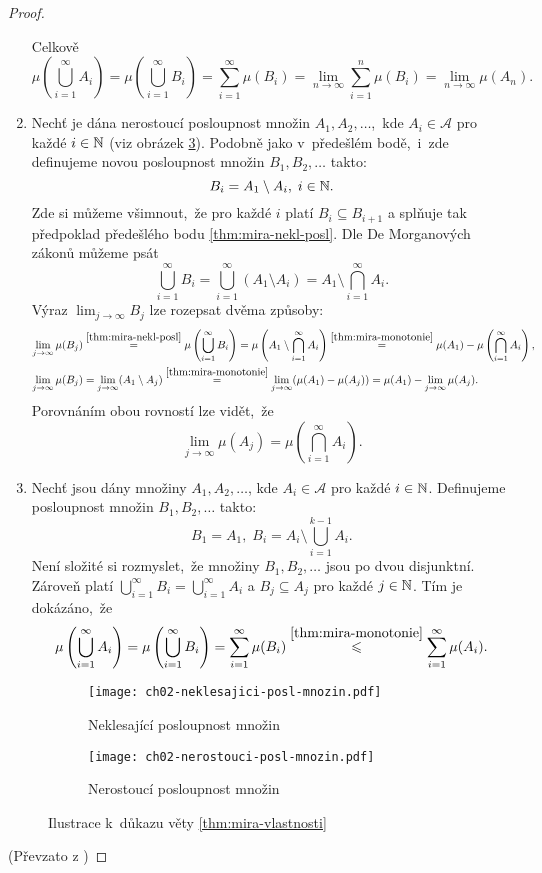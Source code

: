 \begin{proof}
\begin{enumerate}[label=\textit{(\roman*)}]
        Celkově
        \[\mu\left(\bigcup_{i=1}^\infty A_i\right)=\mu\left(\bigcup_{i=1}^\infty B_i\right)=\sum_{i=1}^{\infty}\mu(B_i)=\lim_{n\to\infty}\sum_{i=1}^{n}\mu(B_i)=\lim_{n\to\infty}\mu(A_n).\]
        \item Nechť je dána nerostoucí posloupnost množin $A_1,A_2,\ldots$,~kde $A_i\in\mathcal{A}$ pro každé $i\in\mathbb{N}$ (viz obrázek \ref{fig:nerost-posl-mnozin}). Podobně jako v~předešlém bodě,~i~zde definujeme novou posloupnost množin $B_1,B_2,\ldots$ takto:
        \[B_i=A_1\setminus A_i,\;i\in\mathbb{N}.\]
        Zde si můžeme všimnout,~že pro každé $i$ platí $B_i\subseteq B_{i+1}$ a splňuje tak předpoklad předešlého bodu \ref{thm:mira-nekl-posl}. Dle De Morganových zákonů můžeme psát
        \[\bigcup_{i=1}^\infty B_i=\bigcup_{i=1}^\infty(A_1\setminus A_i)=A_1\setminus\bigcap_{i=1}^\infty A_i.\]
        Výraz $\lim_{j\to\infty}B_j$ lze rozepsat dvěma způsoby:
        \begin{align*}
            \lim\limits_{j\to\infty}\mu(B_j)&\stackrel{\ref{thm:mira-nekl-posl}}{=}\mu\left(\bigcup\limits_{i=1}^\infty B_i\right)=\mu\left(A_1\setminus\bigcap\limits_{i=1}^\infty A_i\right)\stackrel{\ref{thm:mira-monotonie}}{=}\mu(A_1)-\mu\left(\bigcap\limits_{i=1}^\infty A_i\right),\\
            \lim\limits_{j\to\infty}\mu(B_j)&=\lim_{j\to\infty}(A_1\setminus A_j)\stackrel{\ref{thm:mira-monotonie}}{=}\lim_{j\to\infty}(\mu(A_1)-\mu(A_j))=\mu(A_1)-\lim_{j\to\infty}\mu(A_j).
        \end{align*}
        Porovnáním obou rovností lze vidět,~že
        \[\lim_{j\to\infty}\mu(A_j)=\mu\left(\bigcap\limits_{i=1}^\infty A_i\right).\]
        \item Nechť jsou dány množiny $A_1,A_2,\ldots$, kde $A_i\in\mathcal{A}$ pro každé $i\in\mathbb{N}$. Definujeme posloupnost množin $B_1,B_2,\ldots$ takto:
        \[B_1=A_1,\;B_i=A_i\setminus\bigcup_{i=1}^{k-1} A_i.\]
        Není složité si rozmyslet,~že množiny $B_1,B_2,\ldots$ jsou po dvou disjunktní. Zároveň platí $\bigcup_{i=1}^\infty B_i=\bigcup_{i=1}^\infty A_i$ a $B_j\subseteq A_j$ pro každé $j\in\mathbb{N}$. Tím je dokázáno,~že
        \[\mu\left(\bigcup_{i=1}^\infty A_i\right)=\mu\left(\bigcup_{i=1}^\infty B_i\right)=\sum_{i=1}^{\infty}\mu(B_i)\stackrel{\ref{thm:mira-monotonie}}{\leqslant}\sum_{i=1}^{\infty}\mu(A_i).\]
    \end{enumerate}
    \begin{figure}[h]
        \centering
        \begin{subfigure}{0.45\textwidth}
            \texttt{[image: ch02-neklesajici-posl-mnozin.pdf]}
            \caption{Neklesající posloupnost množin}
            \label{fig:nekl-posl-mnozin}
        \end{subfigure}
        \qquad
        \begin{subfigure}{0.45\textwidth}
            \texttt{[image: ch02-nerostouci-posl-mnozin.pdf]}
            \caption{Nerostoucí posloupnost množin}
            \label{fig:nerost-posl-mnozin}
        \end{subfigure}
        \caption{Ilustrace k~důkazu věty \ref{thm:mira-vlastnosti}}
    \end{figure}
    (Převzato z \citep[str. 19]{Netuka2016})
\end{proof}

